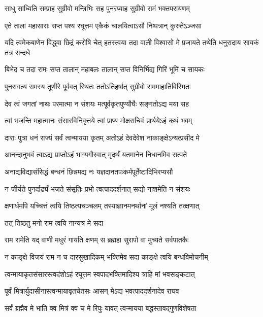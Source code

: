 \twolineshloka
{साधु साध्विति सम्प्राह सुग्रीवो मन्त्रिभिः सह}
{पुनरप्याह सुग्रीवो रामं भक्तपरायणम्} %

\twolineshloka
{एते ताला महासाराः सप्त पश्य रघूत्तम}
{एकैकं चालयित्वाऽसौ निष्पत्रान् कुरुतेऽञ्जसा} %

\threelineshloka
{यदि त्वमेकबाणेन विद्ध्वा छिद्रं करोषि चेत्}
{हतस्त्वया तदा वाली विश्वासो मे प्रजायते}
{तथेति धनुरादाय सायकं तत्र सन्दधे} %

\twolineshloka
{बिभेद च तदा रामः सप्त तालान् महाबलः}
{तालान् सप्त विनिर्भिद्य गिरिं भूमिं च सायकः} %

\twolineshloka
{पुनरागत्य रामस्य तूणीरे पूर्ववत् स्थितः}
{ततोऽतिहर्षात् सुग्रीवो राममाहातिविस्मितः} %

\twolineshloka
{देव त्वं जगतां नाथः परमात्मा न संशयः}
{मत्पूर्वकृतपुण्यौघैः सङ्गतोऽद्य मया सह} %

\twolineshloka
{त्वां भजन्ति महात्मानः संसारविनिवृत्तये}
{त्वां प्राप्य मोक्षसचिवं प्रार्थयेऽहं कथं भवम्} %

\twolineshloka
{दाराः पुत्रा धनं राज्यं सर्वं त्वन्मायया कृतम्}
{अतोऽहं देवदेवेश नाकाङ्क्षेऽन्यत्प्रसीद मे} %

\twolineshloka
{आनन्दानुभवं त्वाऽद्य प्राप्तोऽहं भाग्यगौरवात्}
{मृदर्थं यतमानेन निधानमिव सत्पते} %

\twolineshloka
{अनाद्यविद्यासंसिद्धं बन्धनं छिन्नमद्य नः}
{यज्ञदानतपःकर्मपूर्तेष्टादिभिरप्यसौ} %

\twolineshloka
{न जीर्यते पुनर्दार्ढ्यं भजते संसृतिः प्रभो}
{त्वत्पाददर्शनात् सद्यो नाशमेति न संशयः} %

\twolineshloka
{क्षणार्धमपि यच्चित्तं त्वयि तिष्ठत्यचञ्चलम्}
{तस्याज्ञानमनर्थानां मूलं नश्यति तत्क्षणात्} %

\onelineshloka
{तत् तिष्ठतु मनो राम त्वयि नान्यत्र मे सदा} %

\twolineshloka
{राम रामेति यद् वाणी मधुरं गायति क्षणम्}
{स ब्रह्महा सुरापो वा मुच्यते सर्वपातकैः} %

\twolineshloka
{न काङ्क्षे विजयं राम न च दारसुखादिकम्}
{भक्तिमेव सदा काङ्क्षे त्वयि बन्धविमोचनीम्} %

\twolineshloka
{त्वन्मायाकृतसंसारस्त्वदंशोऽहं रघूत्तम}
{स्वपादभक्तिमादिश्य त्राहि मां भवसङ्कटात्} %

\twolineshloka
{पूर्वं मित्रार्युदासीनास्त्वन्मायावृतचेतसः}
{आसन् मेऽद्य भवत्पाददर्शनादेव राघव} %

\twolineshloka
{सर्वं ब्रह्मैव मे भाति क्व मित्रं क्व च मे रिपुः}
{यावत् त्वन्मायया बद्धस्तावद्गुणविशेषता} %

